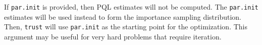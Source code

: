 \documentclass[11pt]{article}\usepackage[]{graphicx}\usepackage[]{color}
\begin{document}
If \texttt{par.init} is provided, then PQL estimates will not be computed. The \texttt{par.init} estimates will be used instead to form the importance sampling distribution. Then, \texttt{trust} will use \texttt{par.init} as the starting point for the optimization. This argument may be useful for very hard problems that require iteration.\\









\end{document}
